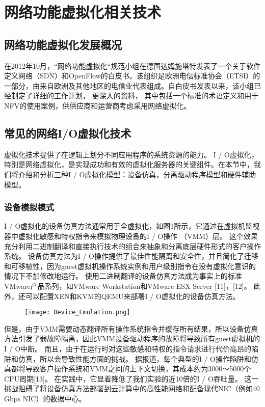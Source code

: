 \chapter{网络功能虚拟化相关技术}
\label{chap:relatedwork}

\section{网络功能虚拟化发展概况}
在2012年10月，“网络功能虚拟化“规范小组在德国达姆施塔特发表了一个关于软件定义网络（SDN）和OpenFlow的白皮书\cite{etsi2012introductory}。该组织是欧洲电信标准协会（ETSI）的一部分，由来自欧洲及其他地区的电信业代表组成。自白皮书发表以来，该小组已经制定了详细的工作计划，
更深入的资料，
其中包括一个标准的术语定义和用于NFV的使用案例，供供应商和运营商考虑采用网络虚拟化。

\section{常见的网络I/O虚拟化技术}
虚拟化技术提供了在逻辑上划分不同应用程序的系统资源的能力。 I / O虚拟化，特别是网络虚拟化，是实现成功和有效的虚拟化服务器的关键组件。在本节中，我们将介绍和分析三种I / O虚拟化模型：设备仿真，分离驱动程序模型和硬件辅助模型。

\subsection{设备模拟模式}
I / O虚拟化的设备仿真方法通常用于全虚拟化，如图1所示，它通过在虚拟机监视器中虚拟化敏感和特权指令来模拟物理设备的I / O操作
（VMM）层。 这个效果充分利用二进制翻译和直接执行技术的组合来抽象和分离底层硬件形式的客户操作系统。 设备仿真方法为I / O操作提供了最佳性能隔离和安全性，并且简化了迁移和可移植性，因为guest虚拟机操作系统实例和用户级别指令在没有虚拟化意识的情况下不加修改地运行。 使用二进制翻译的设备仿真方法成为事实上的标准VMware产品系列，如VMware Workstation和VMware ESX Server [11]，[12]。 此外，还可以配置XEN和KVM的QEMU来部署I / O虚拟化的设备仿真方法。
\begin{figure}[!htp]
	\centering
	\texttt{[image: Device\_Emulation.png]}
\end{figure}
但是，由于VMM需要动态翻译所有操作系统指令并缓存所有结果，所以设备仿真方法引发了弱故障隔离，因此VMM设备驱动程序的故障将导致所有guest虚拟机的I / O中断。 而且，由于在运行时对这些敏感和特权的指令请求进行代价高昂的陷阱和仿真，所以会导致性能方面的挑战。 据报道，每个典型的I / O操作陷阱和仿真都将导致客户操作系统和VMM之间的上下文切换，其成本约为3000〜5000个CPU周期[13]。 在实践中，它显着降低了我们实验的近10倍的I / O吞吐量。 这一挑战阻碍了将设备仿真方法部署到云计算中的高性能网络和配备现代NIC（例如40 Gbps NIC）的数据中心。

